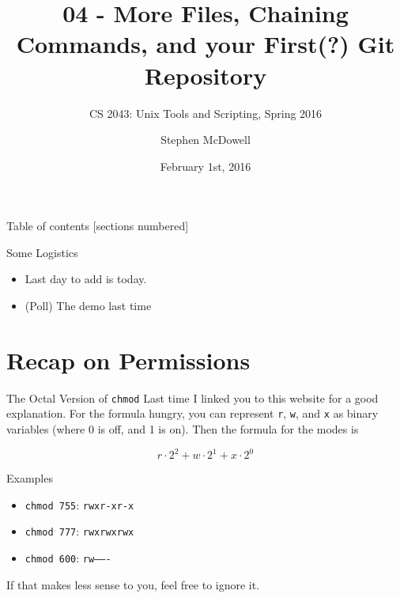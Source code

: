 \documentclass[11pt]{beamer}
\title{04 \-- More Files, Chaining Commands, and your First(?) Git Repository}
\subtitle{CS 2043: Unix Tools and Scripting, Spring 2016 \cite{prevSemesters}}
\date{February 1st, 2016}
\author{Stephen McDowell}
\institute{Cornell University}
\begin{document}
\maketitle

\begin{frame}{Table of contents}
  [sections numbered]
  \tableofcontents[hideallsubsections]
\end{frame}

\begin{frame}{Some Logistics}
  \begin{itemize}[<+- | alert@+>]
    \item Last day to add is today.
    \item (Poll) The demo last time
  \end{itemize}
\end{frame}

%
\section{Recap on Permissions}
\label{sec:recap_on_permissions}

\begin{frame}[fragile]{The Octal Version of \texttt{chmod}}
  Last time I linked you to this\cite{chmod} website for a good explanation.  For the formula hungry, you can
  represent \texttt{r}, \texttt{w}, and \texttt{x} as binary variables (where 0 is off, and 1 is on).  Then
  the formula for the modes is

  $$
    r\cdot2^2 + w\cdot2^1 + x\cdot2^0
  $$

  \begin{block}{Examples}
    \begin{itemize}
      \item \texttt{chmod 755}: \texttt{rwxr-xr-x}
      \item \texttt{chmod 777}: \texttt{rwxrwxrwx}
      \item \texttt{chmod 600}: \texttt{rw-------}
    \end{itemize}
  \end{block}

  If that makes less sense to you, feel free to ignore it.
\end{frame}
\end{document}
